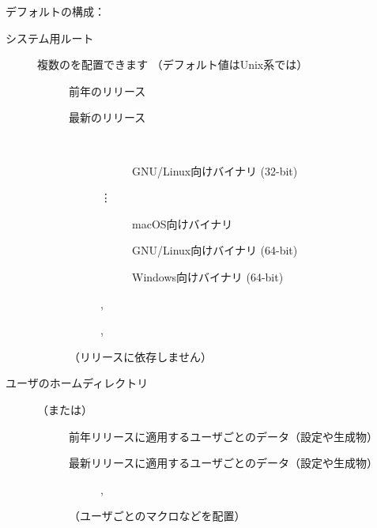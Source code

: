\documentclass[uplatex,dvipdfmx,12pt,tombow]{jsarticle}
\begin{document}
\noindent
デフォルトの\TL 構成：
%
\begin{description}
\item[システム用ルート] 複数の\TL を配置できます
  （デフォルト値はUnix系では）
  \begin{description}
  \item[] 前年のリリース
  \item[] 最新のリリース
    \begin{description}
    \item[] ~
      \begin{description}
      \item[] GNU/Linux向けバイナリ (32-bit)
      \item[\quad\vdots]
      \item[] macOS向けバイナリ
      \item[] GNU/Linux向けバイナリ (64-bit)
      \item[] Windows向けバイナリ (64-bit)
      \end{description}
    \item[] , 
    \item[] , 
    \item[] 
    \end{description}
  \item[] （リリースに依存しません）
  \end{description}
\item[ユーザのホームディレクトリ] （または）
  \begin{description}
  \item[] 前年リリースに適用するユーザごとのデータ（設定や生成物）
  \item[] 最新リリースに適用するユーザごとのデータ（設定や生成物）
    \begin{description}
    \item[] , 
    \item[] 
    \end{description}
  \item[] （ユーザごとのマクロなどを配置）
  \end{description}
\end{description}
\end{document}
